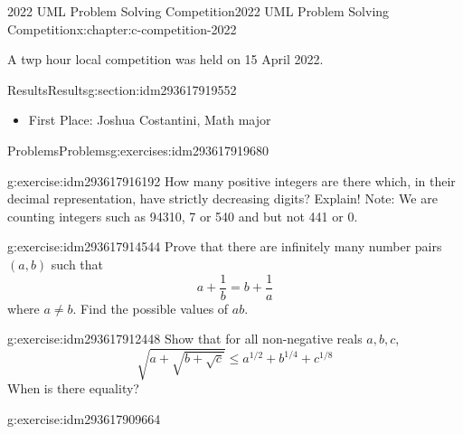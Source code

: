 \documentclass[twoside,10pt,]{book}
\numberwithin{equation}{section}
\begin{document}
%
%
\typeout{************************************************}
\typeout{************************************************}
%
\begin{chapterptx}{2022 UML Problem Solving Competition}{}{2022 UML Problem Solving Competition}{}{}{x:chapter:c-competition-2022}
\begin{introduction}{}%
A twp hour local competition was held on 15 April 2022.%
\end{introduction}%
%
%
\typeout{************************************************}
\typeout{************************************************}
%
\begin{sectionptx}{Results}{}{Results}{}{}{g:section:idm293617919552}
%
\begin{itemize}[label=\textbullet]
\item{}First Place:  Joshua Costantini, Math major%
\end{itemize}
%
\end{sectionptx}
%
%
\typeout{************************************************}
\typeout{************************************************}
%
\begin{exercises-section}{Problems}{}{Problems}{}{}{g:exercises:idm293617919680}
\begin{divisionexercise}{1}{}{}{g:exercise:idm293617916192}%
How many positive integers are there which, in their decimal representation, have strictly decreasing digits? Explain!  Note:  We are counting integers such as  94310, 7 or 540 and but not 441 or 0.%
\end{divisionexercise}%
\begin{divisionexercise}{2}{}{}{g:exercise:idm293617914544}%
Prove that there are infinitely many number pairs \((a,b)\) such that%
\begin{equation*}
a+\frac{1}{b}=b+\frac{1}{a}
\end{equation*}
where \(a\neq b\). Find the possible values of \(ab\).%
\end{divisionexercise}%
\begin{divisionexercise}{3}{}{}{g:exercise:idm293617912448}%
Show that for all non-negative reals \(a, b, c\),%
\begin{equation*}
\sqrt{a + \sqrt{b + \sqrt{c}}} \leq a^{1/2}+ b^{1/4} + c^{1/8}
\end{equation*}
When is there equality?%
\end{divisionexercise}%
\begin{divisionexercise}{4}{}{}{g:exercise:idm293617909664}%

\end{divisionexercise}
\end{exercises-section}
\end{chapterptx}
\end{document}
